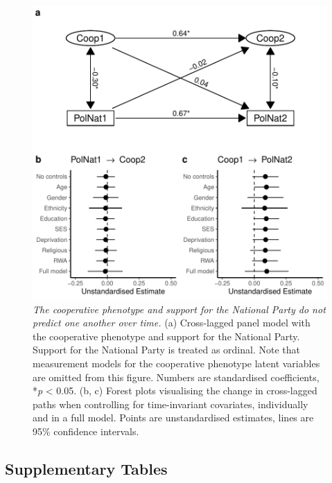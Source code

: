 \documentclass[
  man,floatsintext]{apa6}
\begin{document}
\begin{figure}
\centering
\includegraphics{manuscript_files/figure-latex/clpmPlotPolNat-1.pdf}
\caption{\label{fig:clpmPlotPolNat}\emph{The cooperative phenotype and support for the National Party do not predict one another over time.} (a) Cross-lagged panel model with the cooperative phenotype and support for the National Party. Support for the National Party is treated as ordinal. Note that measurement models for the cooperative phenotype latent variables are omitted from this figure. Numbers are standardised coefficients, *\emph{p} \textless{} 0.05. (b, c) Forest plots visualising the change in cross-lagged paths when controlling for time-invariant covariates, individually and in a full model. Points are unstandardised estimates, lines are 95\% confidence intervals.}
\end{figure}

\newpage

\hypertarget{supplementary-tables}{%
\subsection{Supplementary Tables}\label{supplementary-tables}}
\end{document}
